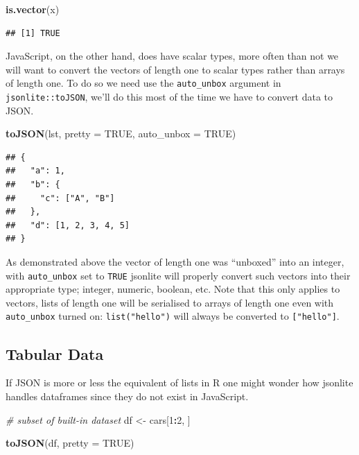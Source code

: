 \documentclass[
]{krantz}
\makeatletter
\newenvironment{Shaded}{\begin{snugshade}}{\end{snugshade}}
\newcommand{\CommentTok}[1]{\textcolor[rgb]{0.37,0.37,0.37}{\textit{#1}}}
\newcommand{\DataTypeTok}[1]{\textcolor[rgb]{0.27,0.27,0.27}{#1}}
\newcommand{\DecValTok}[1]{\textcolor[rgb]{0.06,0.06,0.06}{#1}}
\newcommand{\KeywordTok}[1]{\textcolor[rgb]{0.27,0.27,0.27}{\textbf{#1}}}
\newcommand{\NormalTok}[1]{#1}
\newcommand{\OperatorTok}[1]{\textcolor[rgb]{0.43,0.43,0.43}{\textbf{#1}}}
\newcommand{\OtherTok}[1]{\textcolor[rgb]{0.37,0.37,0.37}{#1}}
\newcommand{\StringTok}[1]{\textcolor[rgb]{0.5,0.5,0.5}{#1}}
\newenvironment{kframe}{%
\medskip{}
\setlength{\fboxsep}{.8em}
 \def\at@end@of@kframe{}%
 \ifinner\ifhmode%
  \def\at@end@of@kframe{\end{minipage}}%
  \begin{minipage}{\columnwidth}%
 \fi\fi%
 \def\FrameCommand##1{\hskip\@totalleftmargin \hskip-\fboxsep
 \colorbox{shadecolor}{##1}\hskip-\fboxsep
     \hskip-\linewidth \hskip-\@totalleftmargin \hskip\columnwidth}%
 \MakeFramed {\advance\hsize-\width
   \@totalleftmargin\z@ \linewidth\hsize
   \@setminipage}}%
 {\par\unskip\endMakeFramed%
 \at@end@of@kframe}
\renewenvironment{Shaded}{\begin{kframe}}{\end{kframe}}
\makeatother
\begin{document}
\begin{Shaded}
\begin{Highlighting}[]
\KeywordTok{is.vector}\NormalTok{(x)}
\end{Highlighting}
\end{Shaded}

\begin{verbatim}
## [1] TRUE
\end{verbatim}

JavaScript, on the other hand, does have scalar types, more often than not we will want to convert the vectors of length one to scalar types rather than arrays of length one. To do so we need use the \texttt{auto\_unbox} argument in \texttt{jsonlite::toJSON}, we'll do this most of the time we have to convert data to JSON.

\begin{Shaded}
\begin{Highlighting}[]
\KeywordTok{toJSON}\NormalTok{(lst, }\DataTypeTok{pretty =} \OtherTok{TRUE}\NormalTok{, }\DataTypeTok{auto\_unbox =} \OtherTok{TRUE}\NormalTok{)}
\end{Highlighting}
\end{Shaded}

\begin{verbatim}
## {
##   "a": 1,
##   "b": {
##     "c": ["A", "B"]
##   },
##   "d": [1, 2, 3, 4, 5]
## }
\end{verbatim}

As demonstrated above the vector of length one was ``unboxed'' into an integer, with \texttt{auto\_unbox} set to \texttt{TRUE} jsonlite will properly convert such vectors into their appropriate type; integer, numeric, boolean, etc. Note that this only applies to vectors, lists of length one will be serialised to arrays of length one even with \texttt{auto\_unbox} turned on: \texttt{list("hello")} will always be converted to \texttt{{[}"hello"{]}}.

\hypertarget{basics-tabular}{%
\subsection{Tabular Data}\label{basics-tabular}}

If JSON is more or less the equivalent of lists in R one might wonder how jsonlite handles dataframes since they do not exist in JavaScript.

\begin{Shaded}
\begin{Highlighting}[]
\CommentTok{\# subset of built{-}in dataset}
\NormalTok{df <{-}}\StringTok{ }\NormalTok{cars[}\DecValTok{1}\OperatorTok{:}\DecValTok{2}\NormalTok{, ]}

\KeywordTok{toJSON}\NormalTok{(df, }\DataTypeTok{pretty =} \OtherTok{TRUE}\NormalTok{)}
\end{Highlighting}
\end{Shaded}
\end{document}
